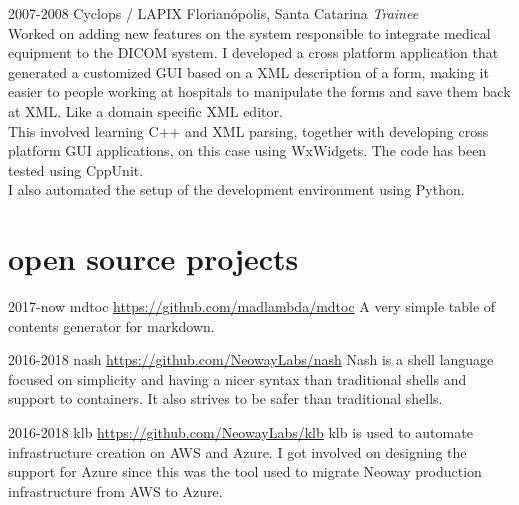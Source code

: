 \documentclass[]{friggeri-cv} %
\begin{document}
\begin{entrylist}
\entry
{2007-2008}
{Cyclops / LAPIX}
{Florianópolis, Santa Catarina}
{\emph{Trainee} \\

Worked on adding new features on the system responsible to
integrate medical equipment to the DICOM system. I developed a
cross platform application that generated a customized GUI
based on a XML description of a form, making it easier to
people working at hospitals to manipulate the forms and save
them back at XML. Like a domain specific XML editor. \\

This involved learning C++ and XML parsing, together with
developing cross platform GUI applications, on this case
using WxWidgets. The code has been tested using CppUnit. \\

I also automated the setup of the development environment
using Python.
}
\end{entrylist}


\pagebreak
\section{open source projects}

\begin{entrylist}
\entry
{2017-now}
{mdtoc}
{\href{https://github.com/madlambda/mdtoc}{https://github.com/madlambda/mdtoc}}
{
A very simple table of contents generator for markdown.
}
\end{entrylist}

\begin{entrylist}
\entry
{2016-2018}
{nash}
{\href{https://github.com/NeowayLabs/nash}{https://github.com/NeowayLabs/nash}}
{
Nash is a shell language focused on simplicity and having a nicer syntax
than traditional shells and support to containers. It also strives to be
safer than traditional shells.
}
\end{entrylist}

\begin{entrylist}
\entry
{2016-2018}
{klb}
{\href{https://github.com/NeowayLabs/klb}{https://github.com/NeowayLabs/klb}}
{
klb is used to automate infrastructure creation on AWS and Azure.
I got involved on designing the support for Azure since this was
the tool used to migrate Neoway production infrastructure from
AWS to Azure.
}
\end{entrylist}
\end{document}

